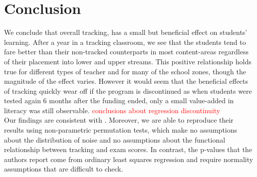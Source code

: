 \documentclass[11pt]{article}
\begin{document}
 
 
 
 
 
\section{Conclusion}
We conclude that overall tracking, has a small but beneficial effect on students' learning.  After a year in a tracking classroom, we see that the students tend to fare better than their non-tracked counterparts in most content-areas regardless of their placement into lower and upper streams.  This positive relationship holds true for different types of teacher and for many of the school zones, though the magnitude of the effect varies.  However it would seem that the beneficial effects of tracking quickly wear off if the program is discontinued as when students were tested again 6 months after the funding ended, only a small value-added in literacy was still observable. \textcolor{red}{conclusions about regression discontinuity} \\

Our findings are consistent with \cite{duflo2011}. Moreover, we are able to reproduce their results using non-parametric permutation tests, which make no assumptions about the distribution of noise and no assumptions about the functional relationship between tracking and exam scores. In contrast, the p-values that the authors report come from ordinary least squares regression and require normality assumptions that are difficult to check.



 
\end{document}
